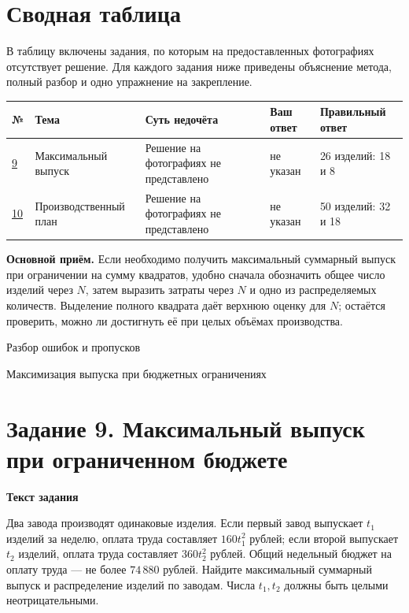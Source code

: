 \documentclass[a4paper,12pt]{article}
\newcommand{\sublabel}[1]{\par\vspace{0.35em}\noindent\textbf{#1}\par\vspace{0.05em}}
\begin{document}
\section*{Сводная таблица}
\noindent\small В таблицу включены задания, по которым на предоставленных фотографиях отсутствует решение. Для каждого задания ниже приведены объяснение метода, полный разбор и одно упражнение на закрепление.\normalsize\par
\vspace{8mm}
\renewcommand{\arraystretch}{1.45}
{\footnotesize\begin{tabularx}{\linewidth}{@{}p{9mm}p{39mm}X p{18mm}p{31mm}@{}}
\toprule
№ & Тема & Суть недочёта & Ваш ответ & Правильный ответ \\
\midrule
\hyperref[task:9]{9} & Максимальный выпуск & Решение на фотографиях не представлено & не указан & 26 изделий: 18 и 8 \\
\addlinespace
\hyperref[task:10]{10} & Производственный план & Решение на фотографиях не представлено & не указан & 50 изделий: 32 и 18 \\
\bottomrule
\end{tabularx}}\par
\vfill
\noindent\textcolor{deep}{\textbf{Основной приём.}} Если необходимо получить максимальный суммарный выпуск при ограничении на сумму квадратов, удобно сначала обозначить общее число изделий через $N$, затем выразить затраты через $N$ и одно из распределяемых количеств. Выделение полного квадрата даёт верхнюю оценку для $N$; остаётся проверить, можно ли достигнуть её при целых объёмах производства.
\clearpage
\thispagestyle{empty}
\vspace*{0.33\textheight}
\begin{center}
{\color{deep}\Huge Разбор ошибок и пропусков}\par
\vspace{5mm}
{\color{muted}\large Максимизация выпуска при бюджетных ограничениях}
\end{center}
\clearpage
{}\label{task:9}
\section*{Задание 9. Максимальный выпуск при ограниченном бюджете}
\sublabel{Текст задания}
Два завода производят одинаковые изделия. Если первый завод выпускает $t_1$ изделий за неделю, оплата труда составляет $160t_1^2$ рублей; если второй выпускает $t_2$ изделий, оплата труда составляет $360t_2^2$ рублей. Общий недельный бюджет на оплату труда --- не более $74\,880$ рублей. Найдите максимальный суммарный выпуск и распределение изделий по заводам. Числа $t_1,t_2$ должны быть целыми неотрицательными.
\end{document}
